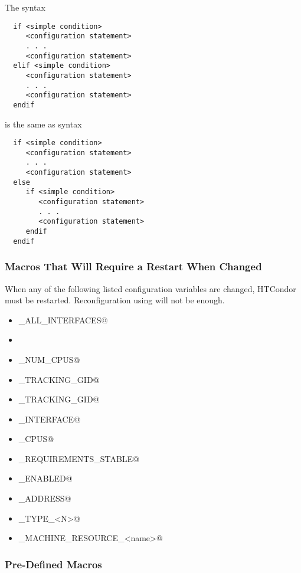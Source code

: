 The syntax
\begin{verbatim}
  if <simple condition>
     <configuration statement>
     . . .
     <configuration statement>
  elif <simple condition>
     <configuration statement>
     . . .
     <configuration statement>
  endif
\end{verbatim}
is the same as syntax
\begin{verbatim}
  if <simple condition>
     <configuration statement>
     . . .
     <configuration statement>
  else
     if <simple condition>
        <configuration statement>
        . . .
        <configuration statement>
     endif
  endif
\end{verbatim}

\subsubsection{\label{sec:Macros-Requiring-Restart}Macros That Will Require a Restart When Changed}
When any of the following listed configuration variables are changed,
HTCondor must be restarted.
Reconfiguration using  will not be enough.

\begin{itemize}
  \item \verb@BIND_ALL_INTERFACES@
  \item \verb@FetchWorkDelay@
  \item \verb@MAX_NUM_CPUS@
  \item \verb@MAX_TRACKING_GID@
  \item \verb@MIN_TRACKING_GID@
  \item \verb@NETWORK_INTERFACE@
  \item \verb@NUM_CPUS@
  \item \verb@PREEMPTION_REQUIREMENTS_STABLE@
  \item \verb@PRIVSEP_ENABLED@
  \item \verb@PROCD_ADDRESS@
  \item \verb@SLOT_TYPE_<N>@
  \item \verb@OFFLINE_MACHINE_RESOURCE_<name>@
\end{itemize}

\subsubsection{\label{sec:Pre-Defined-Macros}Pre-Defined Macros}

